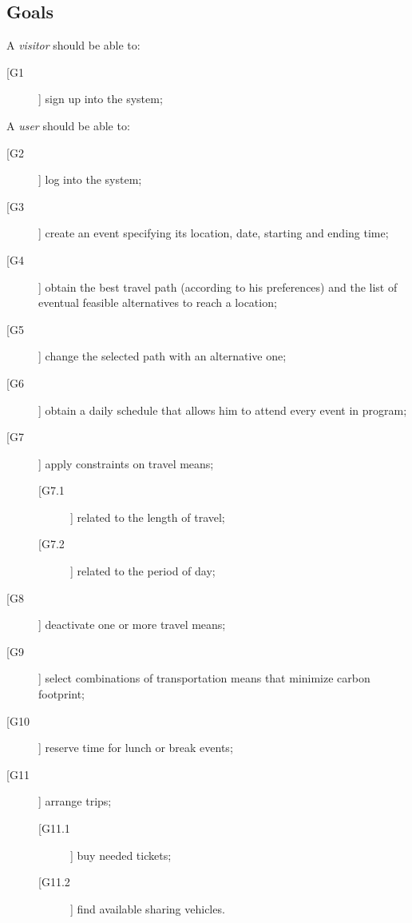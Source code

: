 \subsection{Goals}
A \textit{visitor} should be able to:
\begin{description}
\item [[G1]] sign up into the system;
\end{description}

\noindent A \textit{user} should be able to:
\begin{description}
\item[[G2]] log into the system;
\item[[G3]] create an event specifying its location, date, starting and ending time;
\item[[G4]] obtain the best travel path (according to his preferences) and the list of eventual feasible alternatives to reach a location;
\item[[G5]] change the selected path with an alternative one; 
\item[[G6]] obtain a daily schedule that allows him to attend every event in program;
\newline
\item[[G7]] apply constraints on travel means;
	\begin{description}
	\item[[G7.1]] related to the length of travel;
	\item[[G7.2]] related to the period of day;
	\end{description}
\item[[G8]] deactivate one or more travel means;
\item[[G9]] select combinations of transportation means that minimize carbon footprint;
\item[[G10]] reserve time for lunch or break events;
\item[[G11]] arrange trips;
	\begin{description}
	\item[[G11.1]] buy needed tickets;
	\item[[G11.2]] find available sharing vehicles.
	\end{description}
\end{description}
